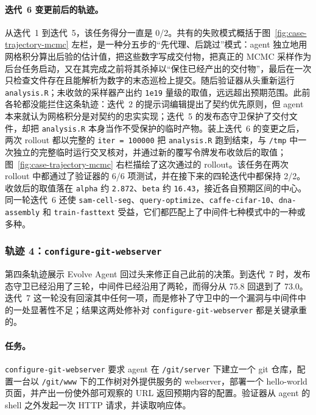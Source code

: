 \paragraph{迭代~6 变更前后的轨迹。}
从迭代~1 到迭代~5，该任务得分一直是 0/2。共有的失败模式概括于图~\ref{fig:case-trajectory-mcmc} 左栏，是一种分五步的“先代理、后跳过”模式：agent 独立地用网格积分算出后验的估计值，把这些数字写成交付物，把真正的 MCMC 采样作为后台任务启动，又在其完成之前将其杀掉以“保住已经产出的交付物”，最后在一次只检查文件存在且能解析为数字的末态巡检上提交。随后验证器从头重新运行 \texttt{analysis.R}；未收敛的采样器产出约 \texttt{1e19} 量级的取值，远远超出预期范围。此前各轮都没能拦住这条轨迹：迭代~2 的提示词编辑提出了契约优先原则，但 agent 本来就认为网格积分是对契约的忠实实现；迭代~5 的发布态守卫保护了交付文件，却把 \texttt{analysis.R} 本身当作不受保护的临时产物。装上迭代~6 的变更之后，两次 rollout 都以完整的 \texttt{iter = 100000} 把 \texttt{analysis.R} 跑到结束，与 \texttt{/tmp} 中一次独立的完整临时运行交叉核对，并通过新的覆写令牌发布收敛后的取值；图~\ref{fig:case-trajectory-mcmc} 右栏描绘了这次通过的 rollout。该任务在两次 rollout 中都通过了验证器的 6/6 项测试，并在接下来的四轮迭代中都保持 2/2。收敛后的取值落在 \texttt{alpha} 约 \texttt{2.872}、\texttt{beta} 约 \texttt{16.43}，接近各自预期区间的中心。同一轮迭代~6 还使 \texttt{sam-cell-seg}、\texttt{query-optimize}、\texttt{caffe-cifar-10}、\texttt{dna-assembly} 和 \texttt{train-fasttext} 受益，它们都匹配上了中间件七种模式中的一种或多种。


\FloatBarrier

\subsubsection{轨迹 4：\texttt{configure-git-webserver}}
\label{app:case-study:cgw}

第四条轨迹展示 Evolve Agent 回过头来修正自己此前的决策。到迭代~7 时，发布态守卫已经沿用了三轮，中间件已经沿用了两轮，而得分从 75.8 回退到了 73.0。迭代~7 这一轮没有回滚其中任何一项，而是修补了守卫中的一个漏洞与中间件中的一处显著性不足；结果这两处修补对 \texttt{configure-git-webserver} 都是关键承重的。

\paragraph{任务。}
\texttt{configure-git-webserver} 要求 agent 在 \texttt{/git/server} 下建立一个 git 仓库，配置一台以 \texttt{/git/www} 下的工作树对外提供服务的 webserver，部署一个 hello-world 页面，并产出一份使外部可观察的 URL 返回预期内容的配置。验证器从 agent 的 shell 之外发起一次 HTTP 请求，并读取响应体。

